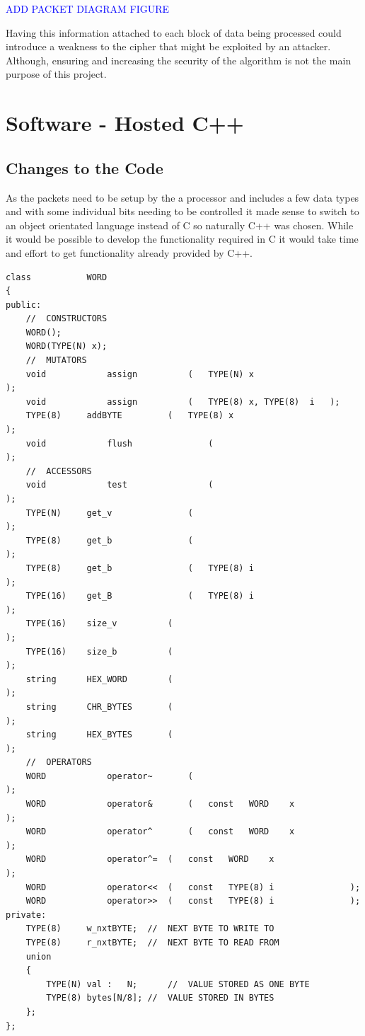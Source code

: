 \documentclass[12pt,twoside,a4paper]{report}
\begin{document}
	\textcolor{blue}{ADD PACKET DIAGRAM FIGURE}
	
	Having this information attached to each block of data being processed could introduce a weakness to the cipher that might be exploited by an attacker. Although, ensuring and increasing the security of the algorithm is not the main purpose of this project.
    
	\section{Software - Hosted C++}
	\label{section:HOSTEDF}
	
	\subsection{Changes to the Code}
	
	As the packets need to be setup by the a processor and includes a few data types and with some individual bits needing to be controlled it made sense to switch to an object orientated language instead of C so naturally C++ was chosen. While it would be possible to develop the functionality required in C it would take time and effort to get functionality already provided by C++.

	\begin{minipage}{\linewidth}
	\begin{lstlisting}[label={lst:WORD_CLASS},caption={Declaration of WORD Class},style=CStyle]
class 			WORD
{
public:
	//	CONSTRUCTORS
	WORD();
	WORD(TYPE(N) x);
	//	MUTATORS
	void			assign			(	TYPE(N)	x							);
	void			assign			(	TYPE(8)	x, TYPE(8)	i	);
	TYPE(8)		addBYTE			(	TYPE(8)	x							);
	void			flush				(												);
	//	ACCESSORS
	void			test				(												);
	TYPE(N)		get_v				(												);
	TYPE(8)		get_b				(												);
	TYPE(8)		get_b				(	TYPE(8)	i							);
	TYPE(16)	get_B				(	TYPE(8)	i							);
	TYPE(16)	size_v			(												);
	TYPE(16)	size_b			(												);
	string		HEX_WORD		(												);
	string		CHR_BYTES		(												);
	string		HEX_BYTES		(												);
	//	OPERATORS
	WORD			operator~		(												);
	WORD			operator&		(	const	WORD	x					);
	WORD			operator^		(	const	WORD	x					);
	WORD			operator^=	(	const	WORD	x					);
	WORD			operator<<	(	const	TYPE(8)	i				);
	WORD			operator>>	(	const	TYPE(8)	i				);
private:
	TYPE(8)		w_nxtBYTE;	//	NEXT BYTE TO WRITE TO
	TYPE(8)		r_nxtBYTE;	//	NEXT BYTE TO READ FROM
	union
	{
		TYPE(N)	val	:	N;		//	VALUE STORED AS ONE BYTE
		TYPE(8)	bytes[N/8];	//	VALUE STORED IN BYTES
	};
};
	\end{lstlisting}
	\end{minipage}
	
\end{document}
